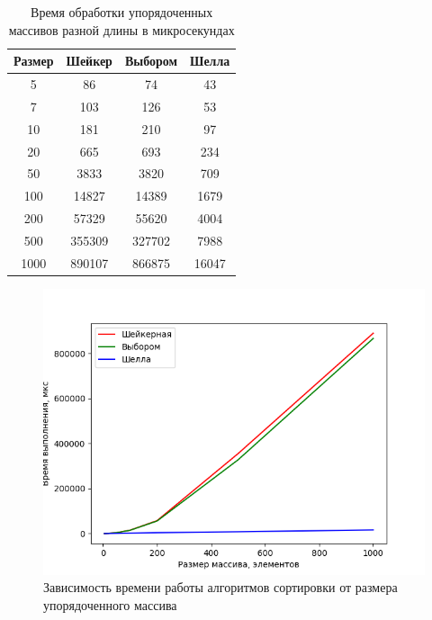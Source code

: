 \documentclass[12pt]{report}
\begin{document}
    \begin{table}[H]
        \begin{center}
            \captionsetup{justification=raggedleft, singlelinecheck=false}
            \caption{\label{tab:sort_time} Время обработки упорядоченных массивов разной длины в микросекундах}
            \begin{tabular}{|c c c c|}
                \hline
                Размер & Шейкер & Выбором & Шелла\\ [0.5ex]
                \hline
                5      & 86     & 74      & 43    \\
                \hline
                7      & 103    & 126     & 53    \\
                \hline
                10     & 181    & 210     & 97    \\
                \hline
                20     & 665    & 693     & 234   \\
                \hline
                50     & 3833   & 3820    & 709   \\
                \hline
                100    & 14827  & 14389   & 1679  \\
                \hline
                200    & 57329  & 55620   & 4004  \\
                \hline
                500    & 355309 & 327702  & 7988  \\
                \hline
                1000   & 890107 & 866875  & 16047 \\
                \hline
            \end{tabular}
        \end{center}
    \end{table}

    \begin{figure}[H]
        \centering
        \includegraphics[width=1\linewidth]{img/sorted_arrays}
        \caption{Зависимость времени работы алгоритмов сортировки от размера упорядоченного массива}
        \label{fig:sort_arrays}
    \end{figure}
\end{document}

